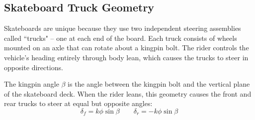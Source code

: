 \documentclass[letterpaper, 10 pt, conference]{ieeeconf}  %
\begin{document}
\subsection{Skateboard Truck Geometry}
\label{sec:skateboard}
Skateboards are unique because they use two independent steering assemblies called ``trucks" -- one at each end of the board. Each truck consists of wheels mounted on an axle that can rotate about a kingpin bolt. The rider controls the vehicle's heading entirely through body lean, which causes the trucks to steer in opposite directions.

The kingpin angle $\beta$ is the angle between the kingpin bolt and the vertical plane of the skateboard deck. When the rider leans, this geometry causes the front and rear trucks to steer at equal but opposite angles:
\begin{equation}
    \delta_{f} = k\phi \sin{\beta} \qquad
    \delta_{r} = -k\phi \sin{\beta}
\end{equation}
\end{document}
